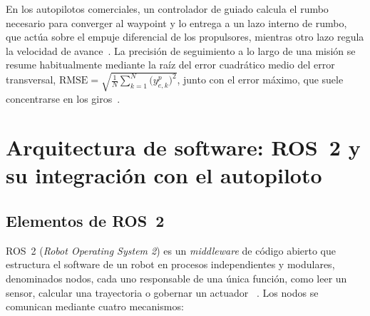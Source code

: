 En los autopilotos comerciales, un controlador de guiado calcula el rumbo necesario para
converger al waypoint y lo entrega a un lazo interno de rumbo, que actúa sobre el empuje
diferencial de los propulsores, mientras otro lazo regula la velocidad de
avance~\cite{kumar2025}. La precisión de seguimiento a lo largo
de una misión se resume habitualmente mediante la raíz del error cuadrático medio del
error transversal,
$\mathrm{RMSE} = \sqrt{\tfrac{1}{N}\sum_{k=1}^{N}\bigl(y_{e,k}^{p}\bigr)^{2}}$, junto
con el error máximo, que suele concentrarse en los giros~\cite{sotelo2023}.
 

 
\section{Arquitectura de software: ROS~2 y su integración con el autopiloto}
\label{sec:arquitectura_software}
 
\subsection{Elementos de ROS~2}
\label{subsec:elementos_ros2}
 
ROS~2 (\textit{Robot Operating System 2}) es un \textit{middleware} de código abierto
que estructura el software de un robot en procesos independientes y modulares,
denominados nodos, cada uno responsable de una única función, como leer un sensor,
calcular una trayectoria o gobernar un actuador~\cite{roach2023} \cite{albatati2026}. Los
nodos se comunican mediante cuatro mecanismos:
 

